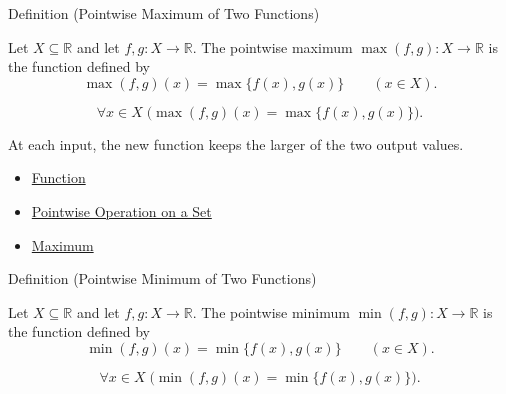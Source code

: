 \begin{definitionbox}{Definition (Pointwise Maximum of Two Functions)}
\begin{definition}
\label{def:pointwise-maximum-of-two-functions}
Let $X\subseteq\mathbb{R}$ and let $f,g:X\to\mathbb{R}$.  The
pointwise maximum $\max(f,g):X\to\mathbb{R}$ is the function defined by
\[
  \max(f,g)(x)=\max\{f(x),g(x)\}
  \qquad (x\in X).
\]
\end{definition}
\end{definitionbox}

\begin{remark*}
\[
  \forall x\in X\;\bigl(\max(f,g)(x)=\max\{f(x),g(x)\}\bigr).
\]
\end{remark*}

\begin{remark*}[Interpretation]
At each input, the new function keeps the larger of the two output values.
\end{remark*}

\begin{dependencies}
\begin{itemize}
  \item \hyperref[def:function]{Function}
  \item \hyperref[def:pointwise-operation-on-set]{Pointwise Operation on a Set}
  \item \hyperref[def:maximum]{Maximum}
\end{itemize}
\end{dependencies}

\begin{definitionbox}{Definition (Pointwise Minimum of Two Functions)}
\begin{definition}
\label{def:pointwise-minimum-of-two-functions}
Let \(X\subseteq\mathbb{R}\) and let \(f,g:X\to\mathbb{R}\).  The
pointwise minimum \(\min(f,g):X\to\mathbb{R}\) is the function defined by
\[
  \min(f,g)(x)=\min\{f(x),g(x)\}
  \qquad (x\in X).
\]
\end{definition}
\end{definitionbox}

\begin{remark*}
\[
  \forall x\in X\;\bigl(\min(f,g)(x)=\min\{f(x),g(x)\}\bigr).
\]
\end{remark*}

